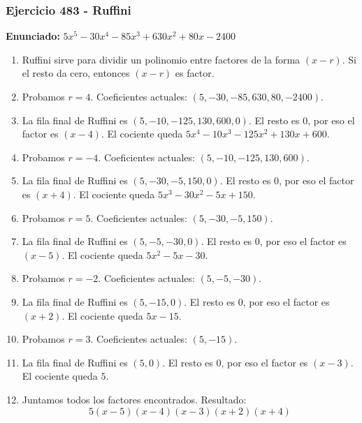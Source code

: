\documentclass[11pt,a4paper]{article}
\begin{document}
\subsubsection*{Ejercicio 483 - Ruffini}
\textbf{Enunciado:} $ 5 x^{5} - 30 x^{4} - 85 x^{3} + 630 x^{2} + 80 x - 2400 $\par
\begin{enumerate}[leftmargin=2em]
\item Ruffini sirve para dividir un polinomio entre factores de la forma \((x-r)\). Si el resto da cero, entonces \((x-r)\) es factor.
\item Probamos \(r=4\). Coeficientes actuales: \((5, -30, -85, 630, 80, -2400)\).
\item La fila final de Ruffini es \((5, -10, -125, 130, 600, 0)\). El resto es \(0\), por eso el factor es \((x-4)\). El cociente queda \(5 x^{4} - 10 x^{3} - 125 x^{2} + 130 x + 600\).
\item Probamos \(r=-4\). Coeficientes actuales: \((5, -10, -125, 130, 600)\).
\item La fila final de Ruffini es \((5, -30, -5, 150, 0)\). El resto es \(0\), por eso el factor es \((x+4)\). El cociente queda \(5 x^{3} - 30 x^{2} - 5 x + 150\).
\item Probamos \(r=5\). Coeficientes actuales: \((5, -30, -5, 150)\).
\item La fila final de Ruffini es \((5, -5, -30, 0)\). El resto es \(0\), por eso el factor es \((x-5)\). El cociente queda \(5 x^{2} - 5 x - 30\).
\item Probamos \(r=-2\). Coeficientes actuales: \((5, -5, -30)\).
\item La fila final de Ruffini es \((5, -15, 0)\). El resto es \(0\), por eso el factor es \((x+2)\). El cociente queda \(5 x - 15\).
\item Probamos \(r=3\). Coeficientes actuales: \((5, -15)\).
\item La fila final de Ruffini es \((5, 0)\). El resto es \(0\), por eso el factor es \((x-3)\). El cociente queda \(5\).
\item Juntamos todos los factores encontrados. Resultado: \[\boxed{5 \left(x - 5\right) \left(x - 4\right) \left(x - 3\right) \left(x + 2\right) \left(x + 4\right)}\]
\end{enumerate}

\vspace{0.2cm}
\end{document}
